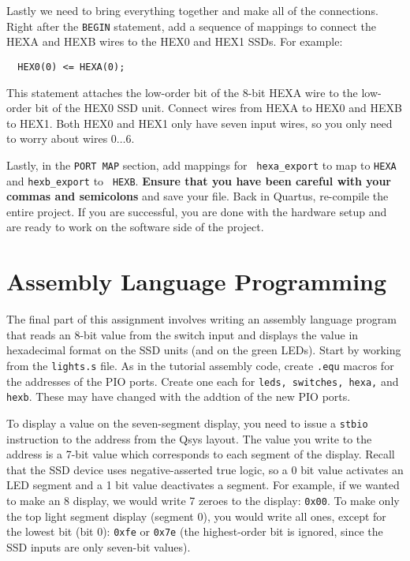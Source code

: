 \documentclass[10pt]{article}
\begin{document}
 Lastly we need to bring everything together and
make all of the connections. Right after the {\tt BEGIN} statement,
add a sequence of mappings to connect the HEXA and HEXB wires to the
HEX0 and HEX1 SSDs. For example:

\begin{verbatim}
  HEX0(0) <= HEXA(0);
\end{verbatim}

This statement attaches the low-order bit of the 8-bit HEXA wire to
the low-order bit of the HEX0 SSD unit. Connect wires from HEXA to
HEX0 and HEXB to HEX1. Both HEX0 and HEX1 only have seven input wires,
so you only need to worry about wires $0\ldots6$.

Lastly, in the {\tt PORT MAP} section, add mappings for {\tt
  hexa\_export} to map to {\tt HEXA} and {\tt hexb\_export} to {\tt
  HEXB}. {\bf Ensure that you have been careful with your commas and
semicolons} and save your file. Back in Quartus, re-compile the entire
project. If you are successful, you are done with the hardware setup
and are ready to work on the software side of the project.

\section{Assembly Language Programming}

The final part of this assignment involves writing an assembly
language program that reads an 8-bit value from the switch input and
displays the value in hexadecimal format on the SSD units (and on the
green LEDs). Start by working from the {\tt lights.s} file. As in the
tutorial assembly code, create {\tt .equ} macros for the addresses of the PIO
ports. Create one each for {\tt leds, switches, hexa,} and {\tt
  hexb}. These may have changed with the addtion of the new PIO ports.

To display a value on the seven-segment display, you need to issue a
{\tt stbio} instruction to the address from the Qsys layout. The value
you write to the address is a 7-bit value which corresponds to each
segment of the display. Recall that the SSD device uses
negative-asserted true logic, so a 0 bit value activates an LED
segment and a 1 bit value deactivates a segment. For example, if we
wanted to make an 8 display, we would write 7 zeroes to the
display: {\tt 0x00}. To make only the top light segment display
(segment 0), you would write all ones, except for the lowest bit (bit
0): {\tt 0xfe} or {\tt 0x7e} (the highest-order bit is ignored, since
the SSD inputs are only seven-bit values).\\
\end{document}

